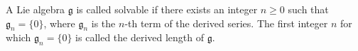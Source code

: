 A Lie algebra $\mathfrak{g}$ is called solvable if there exists an integer $n \geq 0$ such that $\mathfrak{g}_n = \{0\}$, where $\mathfrak{g}_n$ is the $n$-th term of the derived series. The first integer $n$ for which $\mathfrak{g}_n = \{0\}$ is called the derived length of $\mathfrak{g}$.
